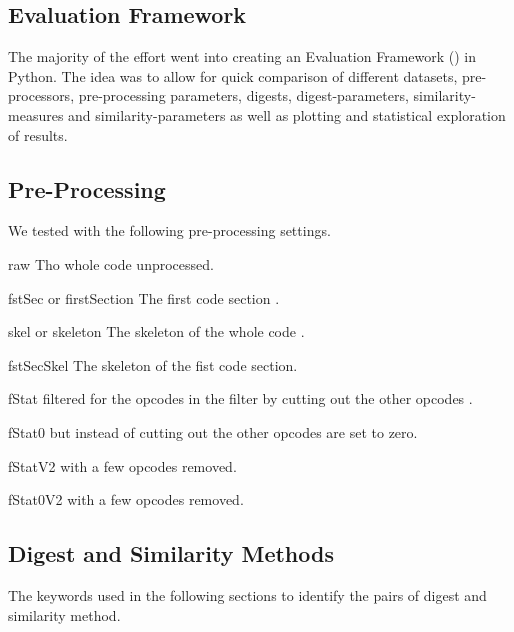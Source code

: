 \documentclass[../main.tex]{subfiles}
\begin{document}
\subsection{Evaluation Framework}
The majority of the effort went into creating an Evaluation Framework () in Python.
The idea was to allow for quick comparison of different datasets, pre-processors, pre-processing parameters, digests, digest-parameters, similarity-measures and similarity-parameters as well as plotting and statistical exploration of results.

\subsection{Pre-Processing}
We tested with the following pre-processing settings.

\begin{desc}
  \item[raw] Tho whole code unprocessed.
  \item[fstSec or firstSection] The first code section .
  \item[skel or skeleton] The skeleton of the whole code .
  \item[fstSecSkel] The skeleton of the fist code section.
  \item[fStat]  filtered for the opcodes in the  filter by cutting out the other opcodes .
  \item[fStat0]  but instead of cutting out the other opcodes are set to zero.
  \item[fStatV2]  with a few opcodes removed.
  \item[fStat0V2]  with a few opcodes removed.
\end{desc}

\subsection{Digest and Similarity Methods}
The keywords used in the following sections to identify the pairs of digest and similarity method.
\end{document}
